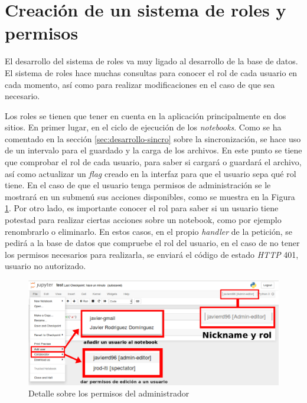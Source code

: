 \documentclass[11pt,spanish,listoffigures]{tfgetsinf}
\begin{document}

\section{Creación de un sistema de roles y permisos}
\label{sec:desarrollo-roles}

El desarrollo del sistema de roles va muy ligado al desarrollo de la base de datos. El sistema de roles hace muchas consultas para conocer el rol de cada usuario en cada momento, así como para realizar modificaciones en el caso de que sea necesario. 

Los roles se tienen que tener en cuenta en la aplicación principalmente en dos sitios. En primer lugar, en el ciclo de ejecución de los \textit{notebooks}. Como se ha comentado en la sección \ref{sec:desarrollo-sincro} sobre la sincronización, se hace uso de un intervalo para el guardado y la carga de los archivos. En este punto se tiene que comprobar el rol de cada usuario, para saber si cargará o guardará el archivo, así como actualizar un \textit{\gls{flag}} creado en la interfaz para que el usuario sepa qué rol tiene. En el caso de que el usuario tenga permisos de administración se le mostrará en un submenú sus acciones disponibles, como se muestra en la Figura \ref{fig:detalle-nb}. Por otro lado, es importante conocer el rol para saber si un usuario tiene potestad para realizar ciertas acciones sobre un notebook, como por ejemplo renombrarlo o eliminarlo. En estos casos, en el propio \textit{handler} de la petición, se pedirá a la base de datos que compruebe el rol del usuario, en el caso de no tener los permisos necesarios para realizarla, se enviará el código de estado \textit{HTTP} 401, usuario no autorizado. 

\begin{figure}[H]
	\centering
  	\includegraphics[width=1\textwidth]{detalle-nb.png}
  	\caption{Detalle sobre los permisos del administrador}
  	\label{fig:detalle-nb}
\end{figure}
\end{document}
